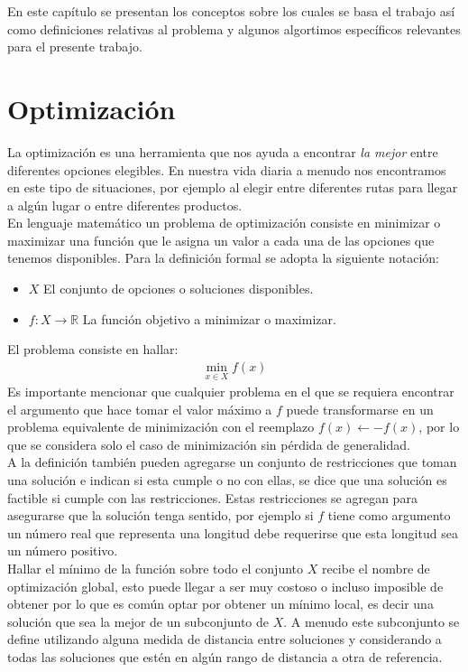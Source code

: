 En este capítulo se presentan los conceptos sobre los cuales se basa el trabajo así como definiciones relativas al problema y algunos algortimos específicos relevantes para el presente trabajo.
\section{Optimización}
La optimización es una herramienta que nos ayuda a encontrar \textit{la mejor} entre diferentes opciones elegibles. En nuestra vida diaria a menudo nos encontramos en este tipo de situaciones, por ejemplo al elegir entre diferentes rutas para llegar a algún lugar o entre diferentes productos.\\

En lenguaje matemático un problema de optimización consiste en minimizar o maximizar una función que le asigna un valor a cada una de las opciones que tenemos disponibles. Para la definición formal se adopta la siguiente notación:
\begin{itemize}
    \item $X$ El conjunto de opciones o soluciones disponibles.
    \item $f:X\rightarrow \mathbb{R}$ La función objetivo a minimizar o maximizar.
\end{itemize}
El problema consiste en hallar:
\begin{gather}
\min_{x\in X} f(x)
\end{gather}
Es importante mencionar que cualquier problema en el que se requiera encontrar el argumento que hace tomar el valor máximo a $f$ puede transformarse en un problema equivalente de minimización con el reemplazo $f(x) \leftarrow -f(x)$, por lo que se considera solo el caso de minimización sin pérdida de generalidad.\\

A la definición también pueden agregarse un conjunto de restricciones que toman una solución e indican si esta cumple o no con ellas, se dice que una solución es factible si cumple con las restricciones. Estas restricciones se agregan para asegurarse que la solución tenga sentido, por ejemplo si $f$ tiene como argumento un número real que representa una longitud debe requerirse que esta longitud sea un número positivo.\\

Hallar el mínimo de la función sobre todo el conjunto $X$ recibe el nombre de optimización global, esto puede llegar a ser muy costoso o incluso imposible de obtener por lo que es común optar por obtener un mínimo local, es decir una solución que sea la mejor de un subconjunto de $X$. A menudo este subconjunto se define utilizando alguna medida de distancia entre soluciones y considerando a todas las soluciones que estén en algún rango de distancia a otra de referencia. \\

